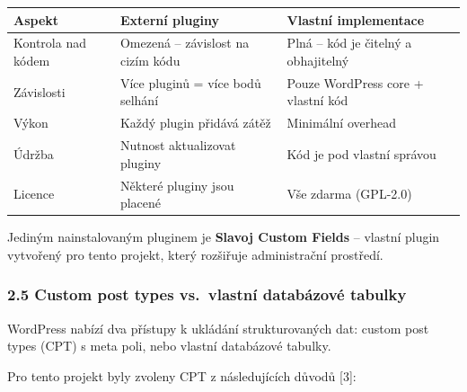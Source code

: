 {\def\LTcaptype{none} %
\begin{longtable}[]{@{}
  >{\raggedright\arraybackslash}p{}
  >{\raggedright\arraybackslash}p{}
  >{\raggedright\arraybackslash}p{}@{}}
\toprule\noalign{}
\begin{minipage}[b]{\linewidth}\raggedright
Aspekt
\end{minipage} & \begin{minipage}[b]{\linewidth}\raggedright
Externí pluginy
\end{minipage} & \begin{minipage}[b]{\linewidth}\raggedright
Vlastní implementace
\end{minipage} \\
\midrule\noalign{}
\endhead
\bottomrule\noalign{}
\endlastfoot
Kontrola nad kódem & Omezená -- závislost na cizím kódu & Plná -- kód je
čitelný a obhajitelný \\
Závislosti & Více pluginů = více bodů selhání & Pouze WordPress core +
vlastní kód \\
Výkon & Každý plugin přidává zátěž & Minimální overhead \\
Údržba & Nutnost aktualizovat pluginy & Kód je pod vlastní správou \\
Licence & Některé pluginy jsou placené & Vše zdarma (GPL-2.0) \\
\end{longtable}
}

Jediným nainstalovaným pluginem je \textbf{Slavoj Custom Fields} --
vlastní plugin vytvořený pro tento projekt, který rozšiřuje
administrační prostředí.

\subsubsection{2.5 Custom post types vs.~vlastní databázové
tabulky}\label{custom-post-types-vs.-vlastnuxed-databuxe1zovuxe9-tabulky}

WordPress nabízí dva přístupy k ukládání strukturovaných dat: custom
post types (CPT) s meta poli, nebo vlastní databázové tabulky.

Pro tento projekt byly zvoleny CPT z následujících důvodů {[}3{]}:

